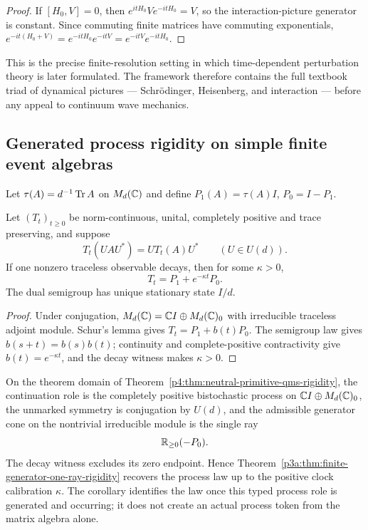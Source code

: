 \documentclass[12pt,a4paper]{article}
\begin{document}
\begin{proof}
If \([H_0,V]=0\), then \(e^{itH_0}Ve^{-itH_0}=V\), so the interaction-picture generator is constant.  Since commuting finite matrices have commuting exponentials, \(e^{-it(H_0+V)}=e^{-itH_0}e^{-itV}=e^{-itV}e^{-itH_0}\).
\end{proof}


This is the precise finite-resolution setting in which time-dependent perturbation theory is later formulated.
The framework therefore contains the full textbook triad of dynamical pictures --- Schr\"odinger, Heisenberg, and interaction --- before any appeal to continuum wave mechanics.




\subsection{Generated process rigidity on simple finite event algebras}
\label{p4:sec:generated-process-rigidity-update}

Let $\tau(A)=d^{-1}\operatorname{Tr} A$ on $M_d(\mathbb{C})$ and define
$P_1(A)=\tau(A)I$, $P_0=I-P_1$.

\begin{theorem}
\label{p4:thm:neutral-primitive-qms-rigidity}
Let $(T_t)_{t\ge0}$ be norm-continuous, unital, completely positive and trace
preserving, and suppose
\[
 T_t(UAU^*)=UT_t(A)U^*
 \qquad(U\in U(d)).
\]
If one nonzero traceless observable decays, then for some $\kappa>0$,
\[
 \boxed{T_t=P_1+e^{-\kappa t}P_0.}
\]
The dual semigroup has unique stationary state $I/d$.
\end{theorem}

\begin{proof}
Under conjugation, $M_d(\mathbb{C})=\mathbb{C} I\oplus M_d(\mathbb{C})_0$ with irreducible
traceless adjoint module.  Schur's lemma gives $T_t=P_1+b(t)P_0$.
The semigroup law gives $b(s+t)=b(s)b(t)$; continuity and complete-positive
contractivity give $b(t)=e^{-\kappa t}$, and the decay witness makes
$\kappa>0$.
\end{proof}

\begin{corollary}
\label{p4:cor:neutral-qms-universal-continuation}
On the theorem domain of
Theorem~\ref{p4:thm:neutral-primitive-qms-rigidity}, the continuation role is
the completely positive bistochastic process on
\(\mathbb{C} I\oplus M_d(\mathbb{C})_0\), the unmarked symmetry is conjugation by
\(U(d)\), and the admissible generator cone on the nontrivial irreducible
module is the single ray
\[
 \mathbb{R}_{\ge0}(-P_0).
\]
The decay witness excludes its zero endpoint.  Hence
Theorem~\ref{p3a:thm:finite-generator-one-ray-rigidity} recovers the process
law up to the positive clock calibration \(\kappa\).  The corollary identifies
the law once this typed process role is generated and occurring; it does not
create an actual process token from the matrix algebra alone.
\end{corollary}
\end{document}
